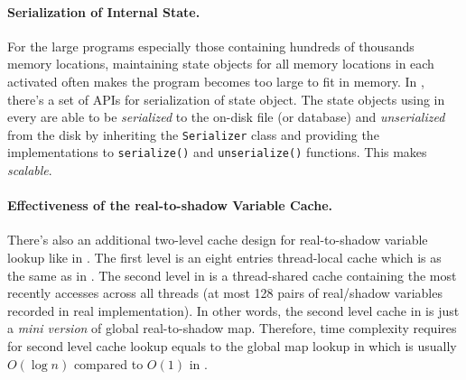 \paragraph{Serialization of \Tracer{} Internal State.} For the large programs especially those containing hundreds of thousands memory locations, maintaining state objects for all memory locations in each activated \Tracer{} often makes the program becomes too large to fit in memory. In \ThreadTracer{}, there's a set of APIs for serialization of state object. The state objects using in every \Tracer{} are able to be \textit{serialized} to the on-disk file (or database) and \textit{unserialized} from the disk by inheriting the \verb|Serializer| class and providing the implementations to \verb|serialize()| and \verb|unserialize()| functions. This makes \ThreadTracer{} \textit{scalable}.

\paragraph{Effectiveness of the real-to-shadow Variable Cache.} There's also an additional two-level cache design for real-to-shadow variable lookup like \ThreadTracer{} in \RoadRunner{}. The first level is an eight entries thread-local cache which is as the same as in \ThreadTracer{}. The second level in \RoadRunner{} is a thread-shared cache containing the most recently accesses across all threads (at most 128 pairs of real/shadow variables recorded in real implementation). In other words, the second level cache in \RoadRunner{} is just a \textit{mini version} of global real-to-shadow map. Therefore, time complexity requires for second level cache lookup equals to the global map lookup in \RoadRunner{} which is usually $O(\log n)$ compared to $O(1)$ in \ThreadTracer{}.
